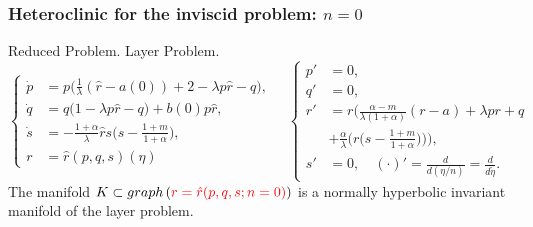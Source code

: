 \documentclass{beamer}
\def\red{\color{red}}
\def\blue{\color{blue}}
\begin{document}
\begin{frame}
 \frametitle{Heteroclinic for the inviscid problem: $n=0$}
 
   \vfill
  {\footnotesize
    \hspace{3em} {Reduced Problem.} \hspace{12em} Layer Problem.
\begin{equation*} %
 \left\{
 \begin{aligned}
 \dot{p} &=p\Big(\frac{1}{\lambda}(\hat{r}-a(0)) + 2- \lambda p \hat{r} -q\Big),\\
 \dot{q} &=q\Big(1 -\lambda p \hat{r} -q\Big) + b(0) p \hat{r},\\
 \dot{s} &=- \frac{1+\alpha}{\lambda}\hat{r}s\big(s- \frac{1+m}{1+\alpha}\big),\\
 r&=\hat{r}(p,q,s)(\eta)
 \end{aligned}\right.
 \quad  
 \left\{
 \begin{aligned}
 {p}' &=0,\\
 {q}' &=0,\\
 {r}' &=r\Big(\frac{\alpha-m}{\lambda(1+\alpha)}(r-a) + \lambda pr + q \\
 &+\frac{\alpha}{\lambda}\Big(r\big(s- \frac{1+m}{1+\alpha}\big)\Big)\Big),\\
 {s}' &=0, \quad (\cdot)' = \frac{d}{d(\eta/n)} = \frac{d}{d\tilde\eta}.
 \end{aligned}\right.
\end{equation*}
}
The manifold $K\subset graph\left({\red r=\hat{r}(p,q,s;n=0)}\right)$ is a normally hyperbolic invariant manifold of the layer problem.
 

\end{frame}


\end{document}
